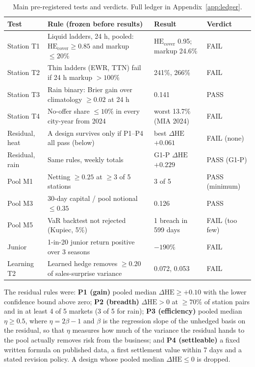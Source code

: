 \documentclass[11pt]{article}
\newcommand{\HEcov}{\mathrm{HE}_{\mathrm{cover}}}
\newcommand{\dHE}{\Delta\mathrm{HE}}
\begin{document}
\begin{table}[ht]
\centering
\small
\caption{Main pre-registered tests and verdicts. Full ledger in Appendix~\ref{app:ledger}.}
\label{tab:tests}
\setlength{\tabcolsep}{4pt}
\begin{tabular}{p{2.0cm}p{5.9cm}p{3.4cm}l}
\toprule
Test & Rule (frozen before results) & Result & Verdict \\
\midrule
Station T1 & Liquid ladders, 24 h, pooled: $\HEcov \ge 0.85$ and markup $\le 20\%$ & $\HEcov$ 0.95; markup 24.6\% & FAIL \\
Station T2 & Thin ladders (EWR, TTN) fail if 24 h markup $> 100\%$ & 241\%, 266\% & FAIL \\
Station T3 & Rain binary: Brier gain over climatology $\ge 0.02$ at 24 h & 0.141 & PASS \\
Station T4 & No-offer share $\le 10\%$ in every city-year from 2024 & worst 13.7\% (MIA 2024) & FAIL \\
Residual, heat & A design survives only if P1--P4 all pass (below) & best $\dHE$ $+0.061$ & FAIL (none) \\
Residual, rain & Same rules, weekly totals & G1-P $\dHE$ $+0.229$ & PASS (G1-P) \\
Pool M1 & Netting $\ge 0.25$ at $\ge 3$ of 5 stations & 3 of 5 & PASS (minimum) \\
Pool M3 & 30-day capital / pool notional $\le 0.35$ & 0.126 & PASS \\
Pool M5 & VaR backtest not rejected (Kupiec, 5\%) & 1 breach in 599 days & FAIL (too few) \\
Junior & 1-in-20 junior return positive over 3 seasons & $-190\%$ & FAIL \\
Learning T2 & Learned hedge removes $\ge 0.20$ of sales-surprise variance & 0.072, 0.053 & FAIL \\
\bottomrule
\end{tabular}
\end{table}

The residual rules were: \textbf{P1 (gain)} pooled median $\dHE \ge +0.10$ with the lower confidence bound above zero; \textbf{P2 (breadth)} $\dHE > 0$ at $\ge 70\%$ of station pairs and in at least 4 of 5 markets (3 of 5 for rain); \textbf{P3 (efficiency)} pooled median $\eta \ge 0.5$, where $\eta = 2\beta - 1$ and $\beta$ is the regression slope of the unhedged basis on the residual, so that $\eta$ measures how much of the variance the residual hands to the pool actually removes risk from the business; and \textbf{P4 (settleable)} a fixed written formula on published data, a first settlement value within 7 days and a stated revision policy. A design whose pooled median $\dHE \le 0$ is dropped.
\end{document}
